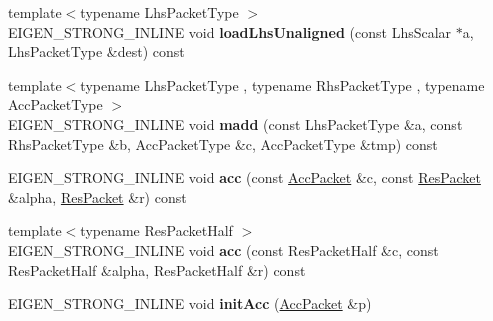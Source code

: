 \begin{DoxyCompactItemize}
\item 
\mbox{\label{class_eigen_1_1internal_1_1gebp__traits_a7a8bf55c8af443448a3f95cd1afecfdf}} 
{\footnotesize template$<$typename Lhs\+Packet\+Type $>$ }\\E\+I\+G\+E\+N\+\_\+\+S\+T\+R\+O\+N\+G\+\_\+\+I\+N\+L\+I\+NE void {\bfseries load\+Lhs\+Unaligned} (const Lhs\+Scalar $\ast$a, Lhs\+Packet\+Type \&dest) const
\item 
\mbox{\label{class_eigen_1_1internal_1_1gebp__traits_a34a49fe7eba0d98b4fb04e2303a17935}} 
{\footnotesize template$<$typename Lhs\+Packet\+Type , typename Rhs\+Packet\+Type , typename Acc\+Packet\+Type $>$ }\\E\+I\+G\+E\+N\+\_\+\+S\+T\+R\+O\+N\+G\+\_\+\+I\+N\+L\+I\+NE void {\bfseries madd} (const Lhs\+Packet\+Type \&a, const Rhs\+Packet\+Type \&b, Acc\+Packet\+Type \&c, Acc\+Packet\+Type \&tmp) const
\item 
\mbox{\label{class_eigen_1_1internal_1_1gebp__traits_a52b30a1314c29a3396bbaa44add57646}} 
E\+I\+G\+E\+N\+\_\+\+S\+T\+R\+O\+N\+G\+\_\+\+I\+N\+L\+I\+NE void {\bfseries acc} (const \hyperlink{class_eigen_1_1internal_1_1_tensor_lazy_evaluator_writable}{Acc\+Packet} \&c, const \hyperlink{class_eigen_1_1internal_1_1_tensor_lazy_evaluator_writable}{Res\+Packet} \&alpha, \hyperlink{class_eigen_1_1internal_1_1_tensor_lazy_evaluator_writable}{Res\+Packet} \&r) const
\item 
\mbox{\label{class_eigen_1_1internal_1_1gebp__traits_a29ddd7548d8516711c78c049d9d89aa7}} 
{\footnotesize template$<$typename Res\+Packet\+Half $>$ }\\E\+I\+G\+E\+N\+\_\+\+S\+T\+R\+O\+N\+G\+\_\+\+I\+N\+L\+I\+NE void {\bfseries acc} (const Res\+Packet\+Half \&c, const Res\+Packet\+Half \&alpha, Res\+Packet\+Half \&r) const
\item 
\mbox{\label{class_eigen_1_1internal_1_1gebp__traits_aa578620545719a8a4a1390c28852ae7b}} 
E\+I\+G\+E\+N\+\_\+\+S\+T\+R\+O\+N\+G\+\_\+\+I\+N\+L\+I\+NE void {\bfseries init\+Acc} (\hyperlink{class_eigen_1_1internal_1_1_tensor_lazy_evaluator_writable}{Acc\+Packet} \&p)
\item 
\mbox{\label{class_eigen_1_1internal_1_1gebp__traits_aa6e3a3234f62ac8d69785a361efb86f9}} 

\end{DoxyCompactItemize}
